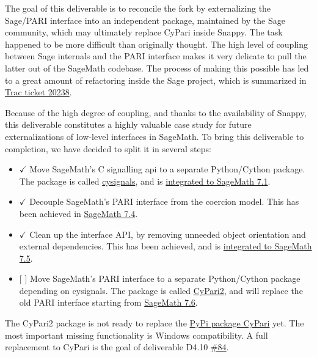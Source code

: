 The goal of this deliverable is to reconcile the fork by externalizing
the Sage/PARI interface into an independent package, maintained by the
Sage community, which may ultimately replace CyPari inside Snappy. The
task happened to be more difficult than originally thought. The high
level of coupling between Sage internals and the PARI interface makes it
very delicate to pull the latter out of the SageMath codebase. The
process of making this possible has led to a great amount of refactoring
inside the Sage project, which is summarized in
\href{http://trac.sagemath.org/ticket/20238}{Trac ticket 20238}.

Because of the high degree of coupling, and thanks to the availability
of Snappy, this deliverable constitutes a highly valuable case study for
future externalizations of low-level interfaces in SageMath. To bring
this deliverable to completion, we have decided to split it in several
steps:

\begin{itemize}
\tightlist
\item
  \(\checkmark\) Move SageMath's C signalling api to a separate
  Python/Cython package. The package is called
  \href{https://github.com/sagemath/cysignals}{cysignals}, and is
  \href{http://trac.sagemath.org/ticket/20002}{integrated to SageMath
  7.1}.
\item
  \(\checkmark\) Decouple SageMath's PARI interface from the coercion
  model. This has been achieved in
  \href{http://trac.sagemath.org/ticket/21158}{SageMath 7.4}.
\item
  \(\checkmark\) Clean up the interface API, by removing unneeded object
  orientation and external dependencies. This has been achieved, and is
  \href{http://trac.sagemath.org/ticket/20241}{integrated to SageMath
  7.5}.
\item
  {[} {]} Move SageMath's PARI interface to a separate Python/Cython
  package depending on cysignals. The package is called
  \href{https://github.com/defeo/cypari2}{CyPari2}, and will replace the
  old PARI interface starting from
  \href{http://trac.sagemath.org/ticket/20238}{SageMath 7.6}.
\end{itemize}

The CyPari2 package is not ready to replace the
\href{https://pypi.python.org/pypi/cypari/}{PyPi package CyPari} yet.
The most important missing functionality is Windows compatibility. A
full replacement to CyPari is the goal of deliverable D4.10
\href{https://github.com/OpenDreamKit/OpenDreamKit/issues/84}{\#84}.

